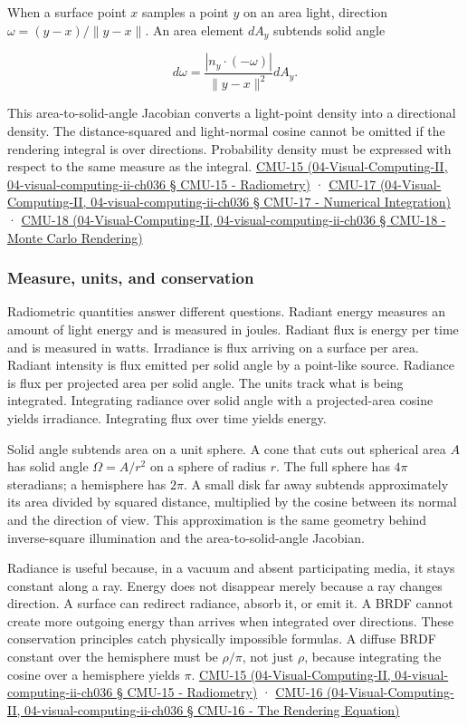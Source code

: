 When a surface point \(x\) samples a point \(y\) on an area light, direction \(\omega=(y-x)/\|y-x\|\). An area element \(dA_y\) subtends solid angle

\[
d\omega=\frac{|n_y\cdot(-\omega)|}{\|y-x\|^2}dA_y.
\]

This area-to-solid-angle Jacobian converts a light-point density into a directional density. The distance-squared and light-normal cosine cannot be omitted if the rendering integral is over directions. Probability density must be expressed with respect to the same measure as the integral. \href{}{CMU-15 (04-Visual-Computing-II, 04-visual-computing-ii-ch036 § CMU-15 - Radiometry)} · \href{}{CMU-17 (04-Visual-Computing-II, 04-visual-computing-ii-ch036 § CMU-17 - Numerical Integration)} · \href{}{CMU-18 (04-Visual-Computing-II, 04-visual-computing-ii-ch036 § CMU-18 - Monte Carlo Rendering)}

\subsubsection{Measure, units, and conservation}\label{measure-units-and-conservation}

Radiometric quantities answer different questions. Radiant energy measures an amount of light energy and is measured in joules. Radiant flux is energy per time and is measured in watts. Irradiance is flux arriving on a surface per area. Radiant intensity is flux emitted per solid angle by a point-like source. Radiance is flux per projected area per solid angle. The units track what is being integrated. Integrating radiance over solid angle with a projected-area cosine yields irradiance. Integrating flux over time yields energy.

Solid angle subtends area on a unit sphere. A cone that cuts out spherical area \(A\) has solid angle \(\Omega=A/r^2\) on a sphere of radius \(r\). The full sphere has \(4\pi\) steradians; a hemisphere has \(2\pi\). A small disk far away subtends approximately its area divided by squared distance, multiplied by the cosine between its normal and the direction of view. This approximation is the same geometry behind inverse-square illumination and the area-to-solid-angle Jacobian.

Radiance is useful because, in a vacuum and absent participating media, it stays constant along a ray. Energy does not disappear merely because a ray changes direction. A surface can redirect radiance, absorb it, or emit it. A BRDF cannot create more outgoing energy than arrives when integrated over directions. These conservation principles catch physically impossible formulas. A diffuse BRDF constant over the hemisphere must be \(\rho/\pi\), not just \(\rho\), because integrating the cosine over a hemisphere yields \(\pi\). \href{}{CMU-15 (04-Visual-Computing-II, 04-visual-computing-ii-ch036 § CMU-15 - Radiometry)} · \href{}{CMU-16 (04-Visual-Computing-II, 04-visual-computing-ii-ch036 § CMU-16 - The Rendering Equation)}

